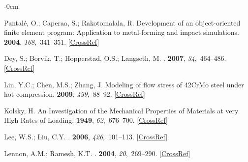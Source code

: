 \documentclass[algorithms,article,accept,pdftex,oneauthors]{Definitions/mdpi}
\begin{document}
\begin{adjustwidth}{-\extralength}{0cm}
{}


%
\begin{thebibliography}{999}

Pantal{\'e}, O.; Caperaa, S.; Rakotomalala, R.
\newblock Development of an object-oriented finite element program: Application
to metal-forming and impact simulations.
 {\bf 2004},
{\em 168},~341--351. [\href{http://doi.org/10.1016/j.cam.2003.04.009}{CrossRef}]

Dey, S.; Borvik, T.; Hopperstad, O.S.; Langseth, M.
.
 {\bf 2007}, {\em
34},~464--486. [\href{http://dx.doi.org/10.1016/j.ijimpeng.2005.10.003}{CrossRef}]

Lin, Y.C.; Chen, M.S.; Zhang, J.
\newblock Modeling of flow stress of {42CrMo} steel under hot compression.
 {\bf 2009}, {\em
499},~88--92. [\href{http://dx.doi.org/10.1016/j.msea.2007.11.119}{CrossRef}]

Kolsky, H.
\newblock An {Investigation} of the {Mechanical} {Properties} of {Materials} at
very {High} {Rates} of {Loading}.
 {\bf 1949}, {\em
62},~676--700. [\href{http://dx.doi.org/10.1088/0370-1301/62/11/302}{CrossRef}]

Lee, W.S.; Liu, C.Y.
.
 {\bf 2006}, {\em
426},~101--113. [\href{http://dx.doi.org/10.1016/j.msea.2006.03.087}{CrossRef}]

Lennon, A.M.; Ramesh, K.T.
.
 {\bf 2004}, {\em
20},~269--290. [\href{http://dx.doi.org/10.1016/S0749-6419(03)00037-8}{CrossRef}]


\end{thebibliography}
\end{adjustwidth}
\end{document}
